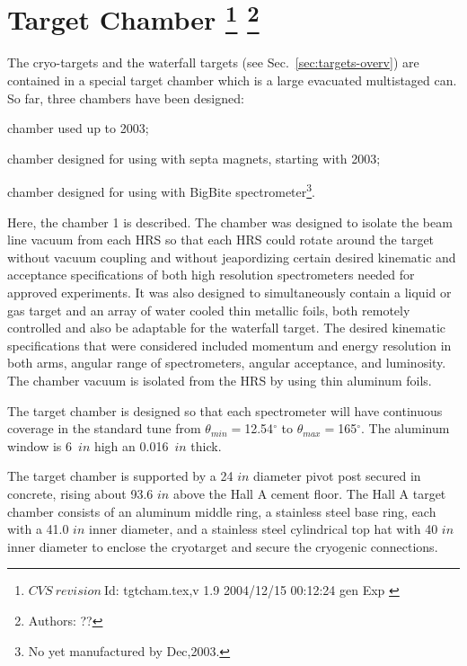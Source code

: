 \chapter[Target Chamber]{Target Chamber
\label{sec:target_chamb}
\footnote{
  $CVS~revision~ $Id: tgtcham.tex,v 1.9 2004/12/15 00:12:24 gen Exp $ $
}
\footnote{Authors: ?? }
}

The cryo-targets and the waterfall targets 
(see Sec.~\ref{sec:targets-overv}) 
are contained in a special target chamber which is a large 
evacuated  multistaged can. So far, three chambers have been designed:
\begin{list}{.~}{\setlength{\itemsep}{-0.15cm}}
  \item chamber used up to 2003;
  \item chamber designed for using with septa magnets, starting with 2003;
  \item chamber designed for using with BigBite spectrometer\footnote{
        No yet manufactured by Dec,2003.}.
\end{list}

Here, the chamber 1 is described.
The chamber was designed to isolate the beam line vacuum from  each
HRS so that each HRS could rotate
around the target without vacuum coupling and without jeapordizing
certain desired kinematic and acceptance  specifications of 
both high resolution spectrometers
needed for approved experiments.  It  was also designed to simultaneously
 contain a liquid or gas target and an array of water cooled thin
 metallic foils, both remotely controlled and also be adaptable for
the waterfall target. The desired kinematic specifications that were
 considered included momentum and energy resolution in both arms,
 angular range of spectrometers, angular acceptance, and luminosity.
The chamber vacuum is isolated from the  HRS by using thin aluminum foils. 

The target chamber is designed so that
each spectrometer will have continuous coverage in the standard tune from
$\theta_{min}=$12.54$^\circ$ to $\theta_{max}=$165$^\circ$.
The aluminum window is 6~$in$ high an 0.016~$in$ thick.

The target chamber is supported by a 24 $in$ diameter pivot post
secured in concrete, rising about 93.6 $in$ above the Hall A cement floor.
The Hall A target chamber
consists of an aluminum middle ring, a stainless steel base ring,
each with a 41.0 $in$ inner diameter,
and a stainless steel cylindrical top hat with 40 $in$ inner diameter
to enclose the cryotarget and secure the cryogenic connections.

